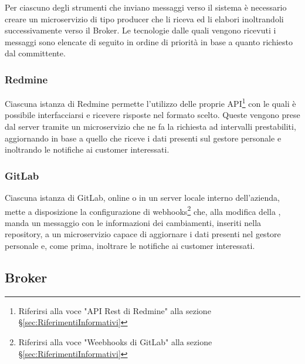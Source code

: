 		Per ciascuno degli strumenti che inviano messaggi verso il sistema è necessario creare un microservizio di tipo producer che li riceva ed li elabori inoltrandoli successivamente verso il Broker.
		Le tecnologie dalle quali vengono ricevuti i messaggi sono elencate di seguito in ordine di priorità in base a quanto richiesto dal committente.

		\subsubsection{Redmine}
		Ciascuna istanza di Redmine permette l'utilizzo delle proprie API\footnote{Riferirsi alla voce "API Rest di Redmine" alla sezione \S\ref{sec:RiferimentiInformativi}} con le quali è possibile interfacciarsi e ricevere risposte nel formato scelto.
		Queste vengono prese dal server tramite un microservizio che ne fa la richiesta ad intervalli prestabiliti, aggiornando in base a quello che riceve i dati presenti sul gestore personale e inoltrando le notifiche ai customer interessati.
		
		\subsubsection{GitLab}
		Ciascuna istanza di GitLab, online o in un server locale interno dell'azienda, mette a disposizione la configurazione di webhooks\footnote{Riferirsi alla voce "Weebhooks di GitLab" alla sezione \S\ref{sec:RiferimentiInformativi}} che, alla modifica della , manda un messaggio con le informazioni dei cambiamenti, inseriti nella repository, a un microservizio capace di aggiornare i dati presenti nel gestore personale e, come prima, inoltrare le notifiche ai customer interessati.
		
		
	\subsection{Broker}
	

